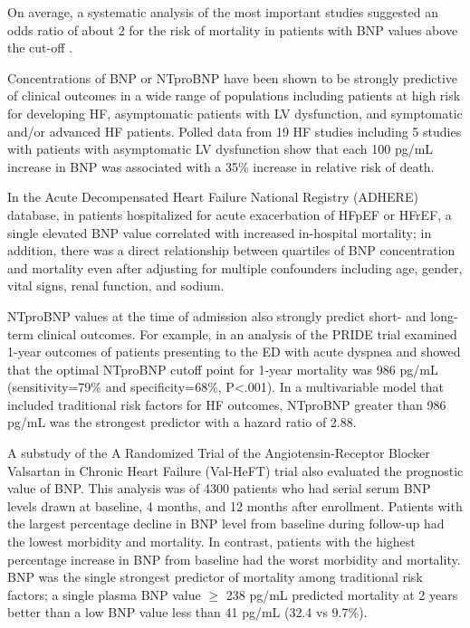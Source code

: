 \documentclass[14pt,a4paper,onecolumn]{extarticle}
\begin{document}
On average, a systematic analysis of the most important studies suggested an odds ratio of about 2 for the risk of mortality in patients with BNP values above the cut-off \citep{bib35}.

Concentrations of BNP or NTproBNP have been shown to be strongly predictive of clinical outcomes in a wide range of populations including patients at high risk for developing HF, asymptomatic patients with LV dysfunction, and symptomatic and/or advanced HF patients. Polled data from 19 HF studies including 5 studies with patients with asymptomatic LV dysfunction show that each 100 pg/mL increase in BNP was associated with a 35\% increase in relative risk of death. \citep{bib3186}

In the Acute Decompensated Heart Failure National Registry (ADHERE) database, in patients hospitalized for acute exacerbation of HFpEF or HFrEF, a single elevated BNP value correlated with increased in-hospital mortality; in addition, there was a direct relationship between quartiles of BNP concentration and mortality even after adjusting for multiple confounders including age, gender, vital signs, renal function, and sodium. \citep{Fonarow2007} %

NTproBNP values at the time of admission also strongly predict short- and long-term clinical outcomes. For example, \citep{Januzzi2006b} in an analysis of the PRIDE trial examined 1-year outcomes of patients presenting to the ED with acute dyspnea and showed that the optimal NTproBNP cutoff point for 1-year mortality was 986 pg/mL (sensitivity=79\% and specificity=68\%, P<.001). In a multivariable model that included traditional risk factors for HF outcomes, NTproBNP greater than 986 pg/mL was the strongest predictor with a hazard ratio of 2.88. \citep{Januzzi2006b} %


A substudy of the A Randomized Trial of the Angiotensin-Receptor Blocker Valsartan in Chronic Heart Failure (Val-HeFT) trial also evaluated the prognostic value of BNP. This analysis was of 4300 patients who had serial serum BNP levels drawn at baseline, 4 months, and 12 months after enrollment. Patients with the largest percentage decline in BNP level from baseline during follow-up had the lowest morbidity and mortality. In contrast, patients with the highest percentage increase in BNP from baseline had the worst morbidity and mortality. BNP was the single strongest predictor of mortality among traditional risk factors; a single plasma BNP value $\geq$ 238 pg/mL predicted mortality at 2 years better than a low BNP value less than 41 pg/mL (32.4 vs 9.7\%). \citep{Anand2003}
\end{document}

